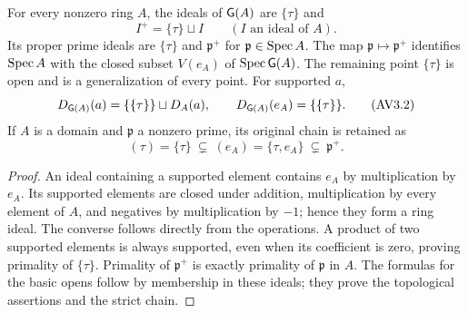 \begin{proposition}\label{prop:ideals}
For every nonzero ring $A$, the ideals of $\mathsf G(A)$ are $\{\tau\}$ and
\[
 I^+=\{\tau\}\sqcup I\qquad(I\text{ an ideal of }A).
 \tag{AV3.1}\label{eq:liftideal}
\]
Its proper prime ideals are $\{\tau\}$ and $\mathfrak p^+$ for
$\mathfrak p\in\operatorname{Spec} A$. The map
$\mathfrak p\mapsto\mathfrak p^+$ identifies $\operatorname{Spec} A$ with the closed
subset $V(e_A)$ of $\operatorname{Spec}\mathsf G(A)$. The remaining point $\{\tau\}$ is open
and is a generalization of every point. For supported $a$,
\[
 D_{\mathsf G(A)}(a)=\{\{\tau\}\}\sqcup D_A(a),\qquad
 D_{\mathsf G(A)}(e_A)=\{\{\tau\}\}.
 \tag{AV3.2}\label{eq:opens}
\]
If $A$ is a domain and $\mathfrak p$ a nonzero prime, its original chain
is retained as
\[
 (\tau)=\{\tau\}\ \subsetneq\ (e_A)=\{\tau,e_A\}
 \ \subsetneq\ \mathfrak p^+.
 \tag{AV3.3}\label{eq:chain}
\]
\end{proposition}
\begin{proof}
An ideal containing a supported element contains $e_A$ by multiplication
by $e_A$. Its supported elements are closed under addition, multiplication
by every element of $A$, and negatives by multiplication by $-1$; hence
they form a ring ideal. The converse follows directly from the operations.
A product of two supported elements is always supported, even when its
coefficient is zero, proving primality of $\{\tau\}$. Primality of
$\mathfrak p^+$ is exactly primality of $\mathfrak p$ in $A$.
The formulas for the basic opens follow by membership in these ideals;
they prove the topological assertions and the strict chain.
\end{proof}

